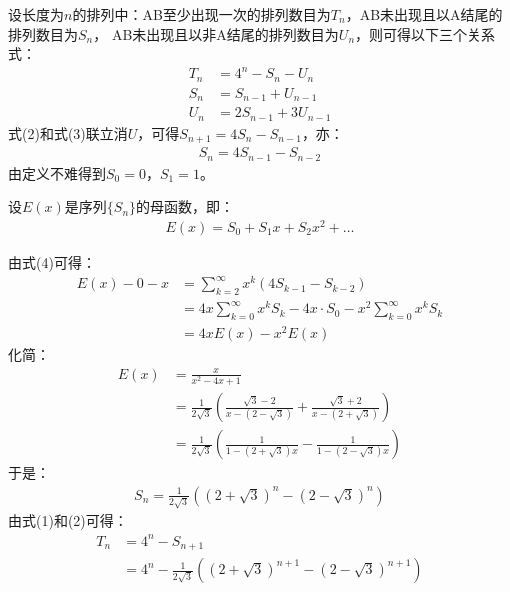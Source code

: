 \begin{solution}
    设长度为$n$的排列中：AB至少出现一次的排列数目为$T_n$，AB未出现且以A结尾的排列数目为$S_n$，
    AB未出现且以非A结尾的排列数目为$U_n$，则可得以下三个关系式：
    \begin{align}
        T_n &= 4^n - S_n - U_n\\
        S_n &= S_{n-1} + U_{n-1}\\
        U_n &= 2S_{n-1} + 3U_{n-1}
    \end{align}
    式(2)和式(3)联立消$U$，可得$S_{n+1}=4S_n-S_{n-1}$，亦：
    \begin{align}
        S_n=4S_{n-1}-S_{n-2}
    \end{align}
    由定义不难得到$S_0=0$，$S_1=1$。

    设$E(x)$是序列$\{S_n\}$的母函数，即：
    \begin{align*}
        E(x)=S_0+S_1x+S_2x^2+\ldots
    \end{align*}

    由式(4)可得：
    \begin{align*}
        E(x) - 0 - x &= \sum_{k=2}^\infty x^k(4S_{k-1}-S_{k-2})\\
        &= 4x\sum_{k=0}^\infty x^kS_{k} - 4x\cdot S_0 - x^2\sum_{k=0}^\infty x^kS_{k}\\
        &= 4xE(x) - x^2E(x)
    \end{align*}
    化简：
    \begin{align*}
        E(x) &= \frac{x}{x^2-4x+1}\\
        &= \frac{1}{2\sqrt{3}}\left(\frac{\sqrt{3}-2}{x-(2-\sqrt{3})}+\frac{\sqrt{3}+2}{x-(2+\sqrt{3})}\right)\\
        &= \frac{1}{2\sqrt{3}}\left(\frac{1}{1-(2+\sqrt{3})x}-\frac{1}{1-(2-\sqrt{3})x}\right)
    \end{align*}
    于是：
    \begin{align*}
        S_n = \frac{1}{2\sqrt{3}}\left((2+\sqrt{3})^n-(2-\sqrt{3})^n\right)
    \end{align*}
    由式(1)和(2)可得：
    \begin{align*}
        T_n &= 4^n - S_{n+1} \\
        &= 4^n - \frac{1}{2\sqrt{3}}\left((2+\sqrt{3})^{n+1}-(2-\sqrt{3})^{n+1}\right)
    \end{align*}



\end{solution}